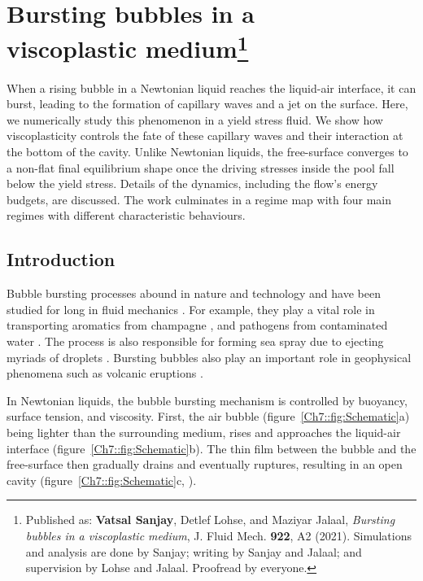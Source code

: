 \chapter[Bursting bubbles in a viscoplastic medium]{Bursting bubbles in a\\ viscoplastic medium\footnote{Published as: \textbf{Vatsal Sanjay}, Detlef Lohse, and Maziyar Jalaal, \textit{Bursting bubbles in a viscoplastic medium}, J. Fluid Mech. \textbf{922}, A2 (2021). Simulations and analysis are done by Sanjay; writing by Sanjay and Jalaal; and supervision by Lohse and Jalaal. Proofread by everyone.}}
\label{chap:BurstingBubbleVP}

When a rising bubble in a Newtonian liquid reaches the liquid-air interface, it can burst, leading to the formation of capillary waves and a jet on the surface. Here, we numerically study this phenomenon in a yield stress fluid. We show how viscoplasticity controls the fate of these capillary waves and their interaction at the bottom of the cavity. Unlike Newtonian liquids, the free-surface converges to a non-flat final equilibrium shape once the driving stresses inside the pool fall below the yield stress. Details of the dynamics, including the flow's energy budgets, are discussed. The work culminates in a regime map with four main regimes with different characteristic behaviours.

\clearpage
\section{Introduction}\label{Sec::introduction}

Bubble bursting processes abound in nature and technology and have been studied for long in fluid mechanics \citep{liger2008recent}. For example, they play a vital role in transporting aromatics from champagne \citep{liger2012physics,vignes2013fizzling,ghabache2014physics,ghabache2016evaporation}, and pathogens from contaminated water \citep{poulain2018biosurfactants,bourouiba2021fluid}. The process is also responsible for forming sea spray due to ejecting myriads of droplets \citep{macintyre1972flow, singh2019numerical}. Bursting bubbles also play an important role in geophysical phenomena such as volcanic eruptions \citep{gonnermann2007fluid}.

In Newtonian liquids, the bubble bursting mechanism is controlled by buoyancy, surface tension, and viscosity. First, the air bubble (figure~\ref{Ch7::fig:Schematic}a) being lighter than the surrounding medium, rises and approaches the liquid-air interface (figure~\ref{Ch7::fig:Schematic}b). The thin film between the bubble and the free-surface then gradually drains \citep{toba1959drop, princen1963shape} and eventually ruptures, resulting in an open cavity (figure~\ref{Ch7::fig:Schematic}c, \citep{mason1954bursting}). 

